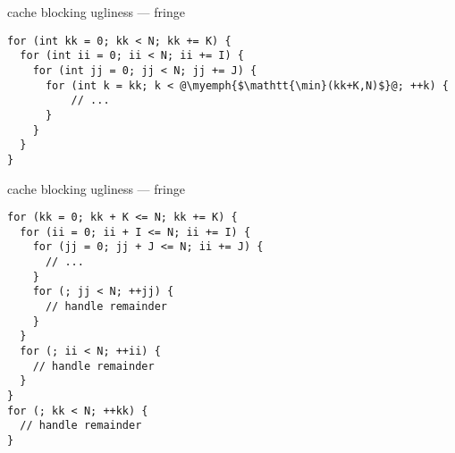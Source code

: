 \begin{frame}[fragile,label=fringeCode1]{cache blocking ugliness --- fringe}
\lstset{
    style=small,
    escapechar=@
}
\begin{lstlisting}
for (int kk = 0; kk < N; kk += K) {
  for (int ii = 0; ii < N; ii += I) {
    for (int jj = 0; jj < N; jj += J) {
      for (int k = kk; k < @\myemph{$\mathtt{\min}(kk+K,N)$}@; ++k) {
          // ...
      }
    }
  }
}
\end{lstlisting}
\end{frame}

\begin{frame}[fragile,label=fringeCode2]{cache blocking ugliness --- fringe}
\lstset{
    style=small,
    escapechar=@
}
\begin{lstlisting}
for (kk = 0; kk + K <= N; kk += K) {
  for (ii = 0; ii + I <= N; ii += I) {
    for (jj = 0; jj + J <= N; ii += J) {
      // ...
    }
    for (; jj < N; ++jj) {
      // handle remainder
    }
  }
  for (; ii < N; ++ii) {
    // handle remainder
  }
}
for (; kk < N; ++kk) {
  // handle remainder
}
\end{lstlisting}
\end{frame}
